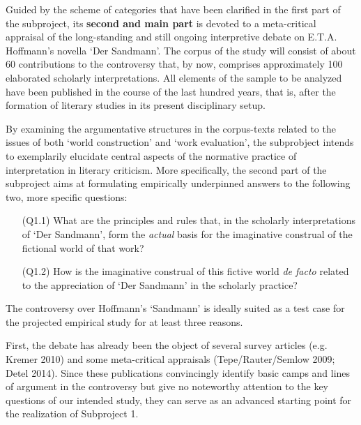 
Guided by the scheme of categories that have been clarified in the first part of the subproject, its \textbf{second and main part} is devoted to a meta-critical appraisal of the long-standing and still ongoing interpretive debate on E.T.A. Hoffmann's novella `Der Sandmann'. The corpus of the study will consist of about 60 contributions to the controversy that, by now, comprises approximately 100 elaborated scholarly interpretations. All elements of the sample to be analyzed have been published in the course of the last hundred years, that is, after the formation of literary studies in its present disciplinary setup. 

By examining the argumentative structures in the corpus-texts related to the issues of both `world construction' and `work evaluation', the subprobject intends to exemplarily elucidate central aspects of the normative practice of interpretation in literary criticism. More specifically, the second part of the subproject aims at formulating empirically underpinned answers to the following two, more specific questions:

\vspace{-.1cm}
\begin{itemize}[leftmargin=2cm]
\item[(Q1.1)] What are the principles and rules that, in the scholarly interpretations of `Der Sandmann', form the \emph{actual} basis for the imaginative construal of the fictional world of that work?
\end{itemize}
\vspace{-.1cm}

\vspace{-.1cm}
\begin{itemize}[leftmargin=2cm]
\item[(Q1.2)] How is the imaginative construal of this fictive world \emph{de facto} related to the appreciation of `Der Sandmann' in the scholarly practice?
\end{itemize}
\vspace{-.1cm}

\noindent The controversy over Hoffmann's `Sandmann' is ideally suited as a test case for the projected empirical study for at least three reasons. 

First, the debate has already been the object of several survey articles (e.g. Kremer 2010) and some meta-critical appraisals (Tepe/Rauter/Semlow 2009; Detel 2014). Since these publications convincingly identify basic camps and lines of argument in the controversy but give no noteworthy attention to the key questions of our intended study, they can serve as an advanced starting point for the realization of Subproject 1. 

